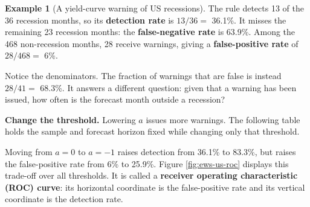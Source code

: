 \documentclass[
  11pt,
]{book}
\theoremstyle{definition}
\theoremstyle{definition}
\newtheorem{example}{Example}[chapter]
\theoremstyle{definition}
\theoremstyle{definition}
\theoremstyle{remark}
\begin{document}
\begin{example}[A yield-curve warning of US recessions]
\begin{table}[H]
\endgroup{}
\end{table}

The rule detects 13 of the 36 recession months, so its \textbf{detection rate} is \(13/36=\) 36.1\%. It misses the remaining 23 recession months: the \textbf{false-negative rate} is 63.9\%. Among the 468 non-recession months, 28 receive warnings, giving a \textbf{false-positive rate} of \(28/468=\) 6\%.

Notice the denominators. The fraction of warnings that are false is instead \(28/41=\) 68.3\%. It answers a different question: given that a warning has been issued, how often is the forecast month outside a recession?

\textbf{Change the threshold.} Lowering \(a\) issues more warnings. The following table holds the sample and forecast horizon fixed while changing only that threshold.

\begin{table}[H]
\centering\begingroup\fontsize{10}{12}\selectfont

\endgroup{}
\end{table}

Moving from \(a=0\) to \(a=-1\) raises detection from 36.1\% to 83.3\%, but raises the false-positive rate from 6\% to 25.9\%. Figure \ref{fig:ews-us-roc} displays this trade-off over all thresholds. It is called a \textbf{receiver operating characteristic (ROC) curve}: its horizontal coordinate is the false-positive rate and its vertical coordinate is the detection rate.


\end{example}
\end{document}
